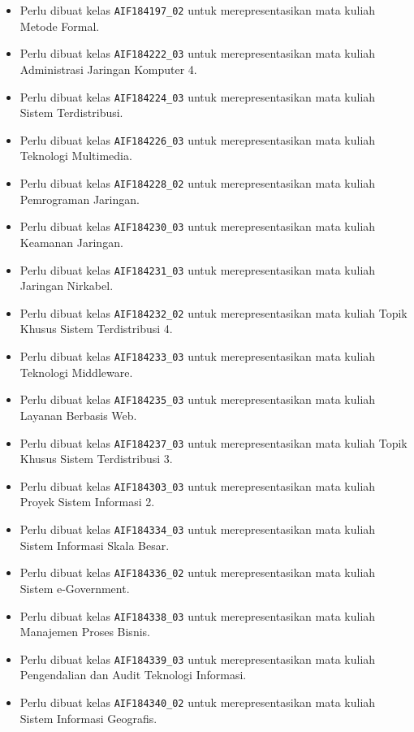 \documentclass[a4paper,twoside]{article}
\begin{document}
\begin{enumerate}
\begin{enumerate}
\begin{enumerate}
\begin{itemize}
					\item Perlu dibuat kelas \texttt{AIF184197\_02} untuk merepresentasikan mata kuliah Metode Formal.
					\item Perlu dibuat kelas \texttt{AIF184222\_03} untuk merepresentasikan mata kuliah Administrasi Jaringan Komputer 4.
					\item Perlu dibuat kelas \texttt{AIF184224\_03} untuk merepresentasikan mata kuliah Sistem Terdistribusi.
					\item Perlu dibuat kelas \texttt{AIF184226\_03} untuk merepresentasikan mata kuliah Teknologi Multimedia.
					\item Perlu dibuat kelas \texttt{AIF184228\_02} untuk merepresentasikan mata kuliah Pemrograman Jaringan.
					\item Perlu dibuat kelas \texttt{AIF184230\_03} untuk merepresentasikan mata kuliah Keamanan Jaringan.
					\item Perlu dibuat kelas \texttt{AIF184231\_03} untuk merepresentasikan mata kuliah Jaringan Nirkabel.
					\item Perlu dibuat kelas \texttt{AIF184232\_02} untuk merepresentasikan mata kuliah Topik Khusus Sistem Terdistribusi 4.
					\item Perlu dibuat kelas \texttt{AIF184233\_03} untuk merepresentasikan mata kuliah Teknologi Middleware.
					\item Perlu dibuat kelas \texttt{AIF184235\_03} untuk merepresentasikan mata kuliah Layanan Berbasis Web.
					\item Perlu dibuat kelas \texttt{AIF184237\_03} untuk merepresentasikan mata kuliah Topik Khusus Sistem Terdistribusi 3.
					\item Perlu dibuat kelas \texttt{AIF184303\_03} untuk merepresentasikan mata kuliah Proyek Sistem Informasi 2.
					\item Perlu dibuat kelas \texttt{AIF184334\_03} untuk merepresentasikan mata kuliah Sistem Informasi Skala Besar.
					\item Perlu dibuat kelas \texttt{AIF184336\_02} untuk merepresentasikan mata kuliah Sistem e-Government.
					\item Perlu dibuat kelas \texttt{AIF184338\_03} untuk merepresentasikan mata kuliah Manajemen Proses Bisnis.
					\item Perlu dibuat kelas \texttt{AIF184339\_03} untuk merepresentasikan mata kuliah Pengendalian dan Audit Teknologi Informasi.
					\item Perlu dibuat kelas \texttt{AIF184340\_02} untuk merepresentasikan mata kuliah Sistem Informasi Geografis.

\end{itemize}
\end{enumerate}
\end{enumerate}
\end{enumerate}
\end{document}
